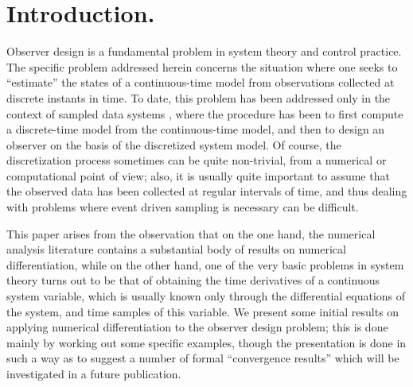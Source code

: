 \begin{abstract}

This paper explores interpolation and numerical differentiation
as a basis for constructing a new approach to the design of nonlinear
observers.  

\end{abstract}


\section{Introduction.}  Observer design is a fundamental problem in system theory and 
control practice.  
The specific problem addressed herein concerns the situation where
one seeks to ``estimate'' the states of a continuous-time model from
observations collected at discrete instants in time.  To date, this problem has
been addressed only in the context of sampled data systems
\cite{grizzle1990b,moraal1992}, where the
procedure has been to first compute
a discrete-time model from the continuous-time model, and
then to design an observer on the basis of the discretized system model.
Of course, the discretization process sometimes can be quite non-trivial, from
a numerical or computational point of view; also, it is usually quite important 
to assume that the observed data has been collected at regular intervals of time,
and thus dealing with problems where event driven sampling is necessary can be difficult.  

This paper arises from the observation that
on the one hand, the numerical analysis literature contains a
substantial body of results on numerical differentiation, while on
the other hand, one of the very basic problems in system theory turns
out to be that of obtaining the time derivatives of a continuous system
variable, which is usually known only through the differential equations of
the system, and time samples of this variable.
We present some initial results on applying numerical differentiation
to the observer design problem; this is done mainly by
working out some specific examples, though the presentation is done
in such a way as to suggest a number of formal ``convergence results'' which will be
investigated in a future publication.

